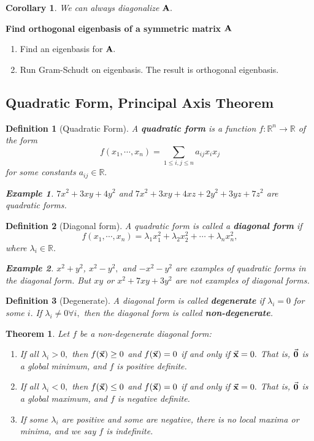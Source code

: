 \documentclass[12pt, a4paper]{article}
\newtheorem{thm}{Theorem}[subsection]
\newtheorem{df}{Definition}[subsection]
\newtheorem{eg}{Example}[subsection]
\newtheorem{cor}{Corollary}[section]
\def\R{{\mathbb{R}}}
\def\vecx{\va{x}}
\def\matrixA{\vb{A}}
\begin{document}
\begin{cor}
	We can always diagonalize $\matrixA.$
\end{cor}
\begin{framed}
\textbf{Find orthogonal eigenbasis of a symmetric matrix $\matrixA$}
\begin{enumerate}
	\item Find an eigenbasis for $\matrixA.$
	\item Run Gram-Schudt on eigenbasis. The result is orthogonal eigenbasis.
\end{enumerate}	
\end{framed}

\subsection{Quadratic Form, Principal Axis Theorem}
\begin{df}[Quadratic Form]
	A \textbf{quadratic form} is a function $f:\R^n\to\R$ of the form \[f(x_1,\cdots,x_n)=\sum_{1\leq i,j\leq n}a_{ij}x_{i}x_{j}\]	for some constants $a_{ij}\in\R.$
	\begin{eg}
		$7x^2+3xy+4y^2$ and $7x^2+3xy+4xz+2y^2+3yz+7z^2$ are quadratic forms.
	\end{eg}
\end{df}
\begin{df}[Diagonal form]
	A quadratic form is called a \textbf{diagonal form} if \[f(x_1,\cdots,x_n)=\lambda_1x_1^2+\lambda_2x_2^2+\cdots+\lambda_nx_n^2,\]	where $\lambda_i\in\R.$
	\begin{eg}
		$x^2+y^2$, $x^2-y^2,$ and $-x^2-y^2$ are examples of quadratic forms in the diagonal form. But $xy$ or $x^2+7xy+3y^2$ are not examples of diagonal forms.
	\end{eg}
\end{df}
\begin{df}[Degenerate]
	A diagonal form is called \textbf{degenerate} if $\lambda_i=0$ for some $i.$ If $\lambda_i\neq0\forall i,$ then the diagonal form is called \textbf{non-degenerate}.	
\end{df}
\begin{thm}
	Let $f$ be a non-degenerate diagonal form: 
	\begin{enumerate}
		\item If all $\lambda_i>0,$ then $f(\vecx)\geq0$ and $f(\vecx)=0$ if and only if $\vecx=0.$ That is, $\va 0$ is a global minimum, and $f$ is positive definite. 
		\item If all $\lambda_i<0,$ then $f(\vecx)\leq0$ and $f(\vecx)=0$ if and only if $\vecx=0.$ That is, $\va 0$ is a global maximum, and $f$ is negative definite. 
		\item If some $\lambda_i$ are positive and some are negative, there is no local maxima or minima, and we say $f$ is indefinite. 
	\end{enumerate}	
\end{thm}
\end{document}
